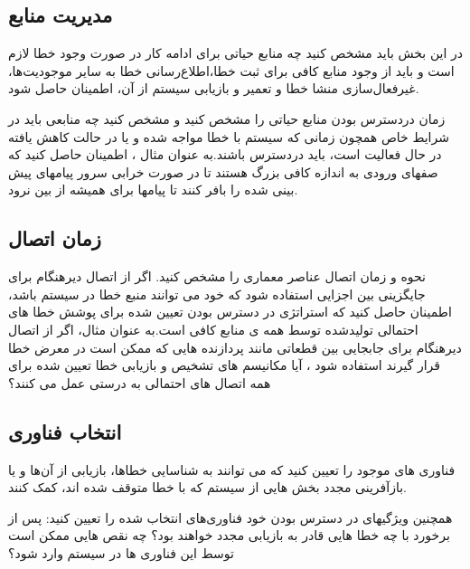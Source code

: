 \subsection{مدیریت منابع}
در این بخش باید مشخص کنید چه منابع حیاتی برای ادامه کار در صورت وجود خطا لازم است و باید از وجود منابع کافی برای ثبت خطا،اطلاع‌رسانی خطا به سایر موجودیت‌ها، غیر‌فعال‌سازی منشا خطا و تعمیر و بازیابی سیستم از آن، اطمینان حاصل شود.

زمان در‌دسترس بودن منابع حیاتی را مشخص کنید و مشخص کنید چه منابعی باید در شرایط خاص همچون زمانی که سیستم با خطا مواجه شده و یا در حالت کاهش یافته در حال فعالیت است، باید در‌دسترس باشند.به عنوان مثال ، اطمینان حاصل کنید که صفهای ورودی به اندازه کافی بزرگ هستند تا در صورت خرابی سرور پیامهای پیش بینی شده را بافر کنند تا پیامها برای همیشه از بین نرود.
\subsection{زمان اتصال}
نحوه و زمان اتصال عناصر معماری را مشخص کنید. اگر از اتصال دیرهنگام برای جایگزینی بین اجزایی استفاده شود که خود می توانند منبع خطا در سیستم باشد، اطمینان حاصل کنید که استراتژی در دسترس بودن تعیین شده برای پوشش خطا های احتمالی تولید‌شده توسط همه ی منابع کافی است.به عنوان مثال، اگر از اتصال دیرهنگام برای جابجایی بین قطعاتی مانند پردازنده هایی که ممکن است در معرض خطا قرار گیرند استفاده شود ، آیا مکانیسم های تشخیص و بازیابی خطا تعیین شده برای همه اتصال های احتمالی به درستی عمل می کنند؟
\subsection{انتخاب فناوری}
فناوری های موجود را تعیین کنید که می توانند به شناسایی خطا‌ها، بازیابی از آن‌ها و یا بازآفرینی مجدد بخش هایی از سیستم که با خطا متوقف شده اند، کمک کنند.

همچنین ویژگیهای در دسترس بودن خود فناوری‌های انتخاب شده را تعیین کنید: پس از برخورد با چه خطا هایی قادر به بازیابی مجدد خواهند بود؟ چه نقص هایی ممکن است توسط این فناوری ها در سیستم وارد شود؟



















